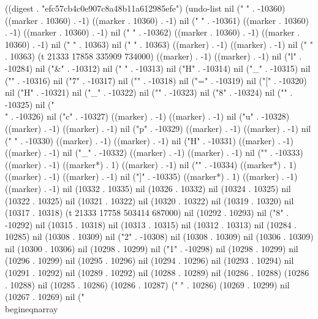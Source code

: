 
((digest . "efc57cb4c0e907c8a48b11a612985efe") (undo-list nil ("
" . -10360) ((marker . 10360) . -1) ((marker . 10360) . -1) nil ("
" . -10361) ((marker . 10360) . -1) ((marker . 10360) . -1) nil ("
" . -10362) ((marker . 10360) . -1) ((marker . 10360) . -1) nil ("
" . 10363) nil ("
" . 10363) ((marker) . -1) ((marker) . -1) nil ("
" . 10363) (t 21333 17858 335909 734000) ((marker) . -1) ((marker) . -1) nil ("l" . -10284) nil ("&" . -10312) nil (" " . -10313) nil ("H" . -10314) nil ("_" . -10315) nil ("{" . -10316) nil ("7" . -10317) nil ("}" . -10318) nil ("=" . -10319) nil ("[" . -10320) nil ("H" . -10321) nil ("_" . -10322) nil ("{" . -10323) nil ("8" . -10324) nil ("}" . -10325) nil ("\\" . -10326) nil ("c" . -10327) ((marker) . -1) ((marker) . -1) nil ("u" . -10328) ((marker) . -1) ((marker) . -1) nil ("p" . -10329) ((marker) . -1) ((marker) . -1) nil (" " . -10330) ((marker) . -1) ((marker) . -1) nil ("H" . -10331) ((marker) . -1) ((marker) . -1) nil ("_" . -10332) ((marker) . -1) ((marker) . -1) nil ("{" . -10333) ((marker) . -1) ((marker*) . 1) ((marker) . -1) nil ("}" . -10334) ((marker*) . 1) ((marker) . -1) ((marker) . -1) nil ("]" . -10335) ((marker*) . 1) ((marker) . -1) ((marker) . -1) nil (10332 . 10335) nil (10326 . 10332) nil (10324 . 10325) nil (10322 . 10325) nil (10321 . 10322) nil (10320 . 10322) nil (10319 . 10320) nil (10317 . 10318) (t 21333 17758 503414 687000) nil (10292 . 10293) nil ("8" . -10292) nil (10315 . 10318) nil (10313 . 10315) nil (10312 . 10313) nil (10284 . 10285) nil (10308 . 10309) nil ("2" . -10308) nil (10308 . 10309) nil (10306 . 10309) nil (10300 . 10306) nil (10298 . 10299) nil ("1" . -10298) nil (10298 . 10299) nil (10296 . 10299) nil (10295 . 10296) nil (10294 . 10296) nil (10293 . 10294) nil (10291 . 10292) nil (10289 . 10292) nil (10288 . 10289) nil (10286 . 10288) (10286 . 10288) nil (10285 . 10286) (10286 . 10287) ("  " . 10286) (10269 . 10299) nil (10267 . 10269) nil ("   \\begin{eqnarray}



